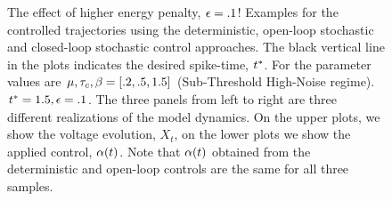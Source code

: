 \documentclass{article}
\begin{document}
\begin{figure}[h]
\begin{center}
\caption[]{The effect of higher energy penalty, ${\epsilon} = .1$!
Examples for the controlled trajectories using the deterministic,
open-loop stochastic and closed-loop stochastic control approaches. The black vertical line in the plots indicates the desired
spike-time, ${ t^* }$. For the parameter values are ${\mu }, { \tau_{c} }, {\beta} = [.2, .5,  1.5]$ (Sub-Threshold
High-Noise regime). ${ t^* } = 1.5, {\epsilon} = .1$. The three panels from left to
right are three different realizations of the model dynamics. On the upper
plots, we show the voltage evolution, $X_t$, on the lower plots we show the
applied control, ${\alpha}(t)$. Note that ${\alpha}(t)$ obtained from the
deterministic and open-loop controls are the same for all three samples.}
\label{fig:control_trajectories_examples_high_epsilon} 
\end{center}
\end{figure} 
\end{document}
